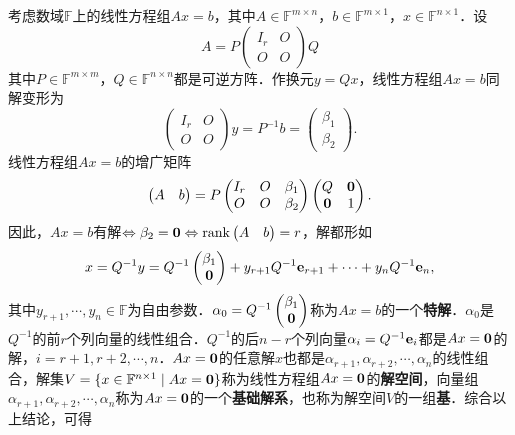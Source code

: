 \documentclass[a4paper,fontset=windows]{ctexbook}
\theoremstyle{definition}
\DeclareMathOperator{\rank}{rank}
\begin{document}
考虑数域$\mathbb{F}$上的线性方程组$Ax=b$，其中$A\in\mathbb{F}^{m\times n}$，$b\in\mathbb{F}^{m\times 1}$，$x\in\mathbb{F}^{n\times 1}$．设
$$A=P\begin{pmatrix}I_r&O \\ O&O\end{pmatrix}Q$$
其中$P\in\mathbb{F}^{m\times m}$，$Q\in\mathbb{F}^{n\times n}$都是可逆方阵．作换元$y=Qx$，线性方程组$Ax=b$同解变形为
$$\begin{pmatrix}I_r&O \\ O&O\end{pmatrix}y=P^{-1}b=\begin{pmatrix}\beta_1 \\ \beta_2\end{pmatrix}.$$
线性方程组$Ax=b$的增广矩阵
$$\begin{pmatrix}A&b\end{pmatrix}=P\begin{pmatrix}I_r&O&\beta_1 \\ O&O&\beta_2\end{pmatrix}\begin{pmatrix}Q&{\bf 0} \\ {\bf 0}&1\end{pmatrix}.$$
因此，$Ax=b$有解$\Leftrightarrow\beta_2={\bf 0}\Leftrightarrow\rank\begin{pmatrix}A&b\end{pmatrix}=r$，解都形如
$$x=Q^{-1}y=Q^{-1}\begin{pmatrix}\beta_1 \\ {\bf 0}\end{pmatrix}+y_{r+1}Q^{-1}{\bf e}_{r+1}+\cdots+y_nQ^{-1}{\bf e}_n,$$
其中$y_{r+1},\cdots,y_n\in\mathbb{F}$为自由参数．$\alpha_0=Q^{-1}\begin{pmatrix}\beta_1 \\ {\bf 0}\end{pmatrix}$称为$Ax=b$的一个{\bf 特解}．$\alpha_0$是$Q^{-1}$的前$r$个列向量的线性组合．$Q^{-1}$的后$n-r$个列向量$\alpha_i=Q^{-1}{\bf e}_i$都是$Ax={\bf 0}$的解，$i=r+1,r+2,\cdots,n$．$Ax={\bf 0}$的任意解$x$也都是$\alpha_{r+1},\alpha_{r+2},\cdots,\alpha_n$的线性组合，解集$V=\{x\in\mathbb{F}^{n\times 1}\mid Ax={\bf 0}\}$称为线性方程组$Ax={\bf 0}$的{\bf 解空间}，向量组$\alpha_{r+1},\alpha_{r+2},\cdots,\alpha_n$称为$Ax={\bf 0}$的一个{\bf 基础解系}，也称为解空间$V$的一组{\bf 基}．综合以上结论，可得
\end{document}

